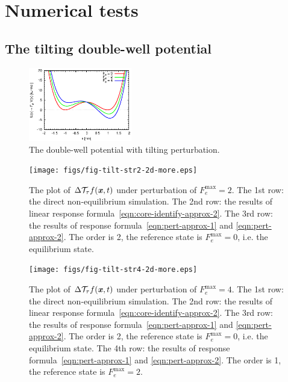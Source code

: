 \documentclass[aip,jcp,a4paper,reprint,onecolumn]{revtex4-1}
\newcommand{\vect}[1]{\textbf{\textit{#1}}}
\newcommand{\mt}{\mathcal T}
\begin{document}
\section{Numerical tests}

\subsection{The tilting double-well potential}

\begin{figure}
  \centering
  \includegraphics[width=0.4\textwidth]{figs/fig-tilt-pot.eps}
  \caption{The double-well potential with tilting perturbation.}
  \label{fig:tmp1}
\end{figure}

\begin{figure}
  \centering
  \texttt{[image: figs/fig-tilt-str2-2d-more.eps]}
  \caption{The plot of $\Delta\mt_\tau f(\vect x,t)$  under perturbation of
    $F_e^{\textrm{max}} = 2$.
    The 1st row: the direct non-equilibrium
    simulation. The 2nd row: the results of linear response
    formula~\eqref{eqn:core-identify-approx-2}.
    The 3rd row: the results of response
    formula~\eqref{eqn:pert-approx-1} and \eqref{eqn:pert-approx-2}.
    The order is 2, the reference state is $F_e^{\textrm{max}} = 0$, i.e.
    the equilibrium state.
  }
  \label{fig:tmp2}
\end{figure}

\begin{figure}
  \centering
  \texttt{[image: figs/fig-tilt-str4-2d-more.eps]}
  \caption{The plot of $\Delta\mt_\tau f(\vect x,t)$  under perturbation of
    $F_e^{\textrm{max}} = 4$.
    The 1st row: the direct non-equilibrium
    simulation. The 2nd row: the results of linear response
    formula~\eqref{eqn:core-identify-approx-2}.
    The 3rd row: the results of response
    formula~\eqref{eqn:pert-approx-1} and \eqref{eqn:pert-approx-2}.
    The order is 2, the reference state is $F_e^{\textrm{max}} = 0$, i.e.
    the equilibrium state.
    The 4th row: the results of response
    formula~\eqref{eqn:pert-approx-1} and \eqref{eqn:pert-approx-2}.
    The order is 1, the reference state is $F_e^{\textrm{max}} = 2$.
  }
  \label{fig:tmp3}
\end{figure}
\end{document}
